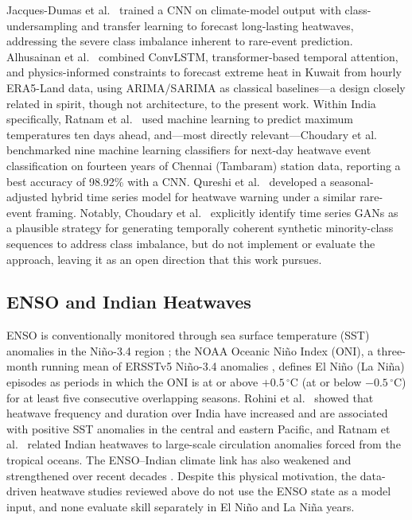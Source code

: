 \documentclass[conference]{IEEEtran}
\begin{document}
Jacques-Dumas et al.~\cite{jacquesdumas2022deep} trained a CNN on climate-model output with
class-undersampling and transfer learning to forecast long-lasting heatwaves, addressing the severe
class imbalance inherent to rare-event prediction. Alhusainan et al.~\cite{alhusainan2025forecasting}
combined ConvLSTM, transformer-based temporal attention, and physics-informed constraints to forecast
extreme heat in Kuwait from hourly ERA5-Land data, using ARIMA/SARIMA as classical baselines---a design
closely related in spirit, though not architecture, to the present work. Within India specifically,
Ratnam et al.~\cite{ratnam2023predicting} used machine learning to predict maximum temperatures ten days
ahead, and---most directly relevant---Choudary et al.~\cite{choudary2025comparative} benchmarked nine
machine learning classifiers for next-day heatwave event classification on fourteen years of Chennai
(Tambaram) station data, reporting a best accuracy of 98.92\% with a CNN. Qureshi et
al.~\cite{qureshi2025developing} developed a seasonal-adjusted hybrid time series model for heatwave
warning under a similar rare-event framing. Notably, Choudary et al.~\cite{choudary2025comparative}
explicitly identify time series GANs as a plausible strategy for generating temporally coherent
synthetic minority-class sequences to address class imbalance, but do not implement or evaluate the
approach, leaving it as an open direction that this work pursues.

\subsection{ENSO and Indian Heatwaves}

ENSO is conventionally monitored through sea surface temperature (SST) anomalies in the Ni\~{n}o-3.4
region \cite{trenberth1997definition}; the NOAA Oceanic Ni\~{n}o Index (ONI), a three-month running
mean of ERSSTv5 Ni\~{n}o-3.4 anomalies \cite{huang2017ersstv5,noaa_oni}, defines El Ni\~{n}o (La
Ni\~{n}a) episodes as periods in which the ONI is at or above $+0.5\,^{\circ}$C (at or below
$-0.5\,^{\circ}$C) for at least five consecutive overlapping seasons. Rohini et al.~\cite{rohini2016variability}
showed that heatwave frequency and duration over India have increased and are associated with
positive SST anomalies in the central and eastern Pacific, and Ratnam et al.~\cite{ratnam2016anatomy}
related Indian heatwaves to large-scale circulation anomalies forced from the tropical oceans. The
ENSO--Indian climate link has also weakened and strengthened over recent decades
\cite{kumar1999weakening}. Despite this physical motivation, the data-driven heatwave studies reviewed
above do not use the ENSO state as a model input, and none evaluate skill separately in El Ni\~{n}o
and La Ni\~{n}a years.
\end{document}
